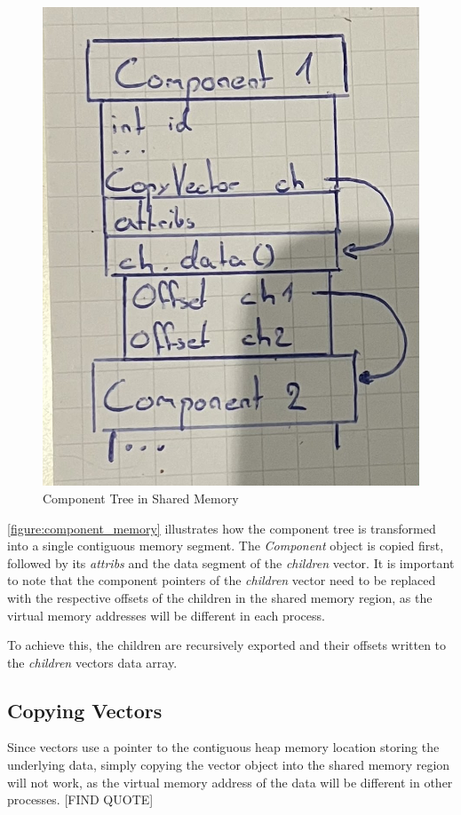 \begin{figure}[!ht] %
    \includegraphics[scale=0.15]{images/component_memory.jpg} %
    \centering
    \caption{Component Tree in Shared Memory}
    \label{figure:component_memory}
\end{figure}

\autoref{figure:component_memory} illustrates how the component tree is transformed into a single contiguous memory segment.
The \emph{Component} object is copied first, followed by its \emph{attribs} and the data segment of the \emph{children} vector.
It is important to note that the component pointers of the \emph{children} vector need to be replaced with the respective offsets of the children in the shared memory region,
as the virtual memory addresses will be different in each process.

To achieve this, the children are recursively exported and their offsets written to the \emph{children} vectors data array.

\subsection{Copying Vectors}
Since vectors use a pointer to the contiguous heap memory location storing the underlying data, simply copying the vector object into the shared memory region will not work,
as the virtual memory address of the data will be different in other processes. [FIND QUOTE] %

